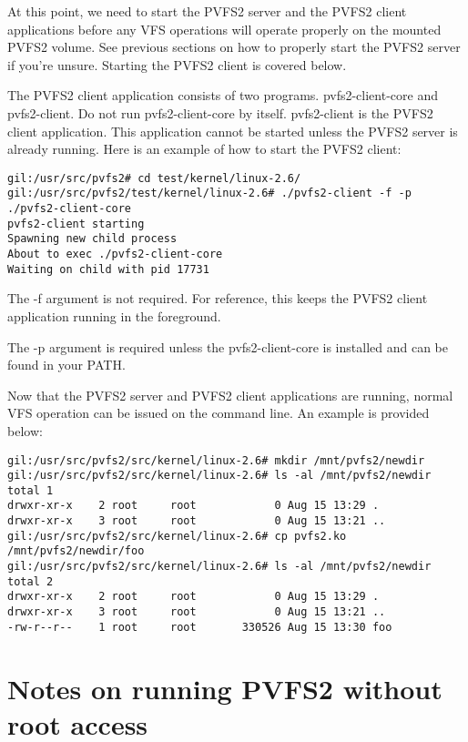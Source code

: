 \documentclass[11pt, letterpaper]{article}
\begin{document}
At this point, we need to start the PVFS2 server and the PVFS2 client
applications before any VFS operations will operate properly on the
mounted PVFS2 volume.  See previous sections on how to properly start
the PVFS2 server if you're unsure.  Starting the PVFS2 client is
covered below.

The PVFS2 client application consists of two programs.
pvfs2-client-core and pvfs2-client.  Do not run pvfs2-client-core by
itself.  pvfs2-client is the PVFS2 client application.  This
application cannot be started unless the PVFS2 server is already
running.  Here is an example of how to start the PVFS2 client:

\begin{verbatim}
gil:/usr/src/pvfs2# cd test/kernel/linux-2.6/
gil:/usr/src/pvfs2/test/kernel/linux-2.6# ./pvfs2-client -f -p ./pvfs2-client-core
pvfs2-client starting
Spawning new child process
About to exec ./pvfs2-client-core
Waiting on child with pid 17731
\end{verbatim}

The -f argument is not required.  For reference, this keeps the PVFS2
client application running in the foreground.

The -p argument is required unless the pvfs2-client-core is installed
and can be found in your PATH.

Now that the PVFS2 server and PVFS2 client applications are running,
normal VFS operation can be issued on the command line.  An example is
provided below:

\begin{verbatim}
gil:/usr/src/pvfs2/src/kernel/linux-2.6# mkdir /mnt/pvfs2/newdir
gil:/usr/src/pvfs2/src/kernel/linux-2.6# ls -al /mnt/pvfs2/newdir
total 1
drwxr-xr-x    2 root     root            0 Aug 15 13:29 .
drwxr-xr-x    3 root     root            0 Aug 15 13:21 ..
gil:/usr/src/pvfs2/src/kernel/linux-2.6# cp pvfs2.ko
/mnt/pvfs2/newdir/foo
gil:/usr/src/pvfs2/src/kernel/linux-2.6# ls -al /mnt/pvfs2/newdir
total 2
drwxr-xr-x    2 root     root            0 Aug 15 13:29 .
drwxr-xr-x    3 root     root            0 Aug 15 13:21 ..
-rw-r--r--    1 root     root       330526 Aug 15 13:30 foo
\end{verbatim}

\appendix

\section{Notes on running PVFS2 without root access}
\end{document}
